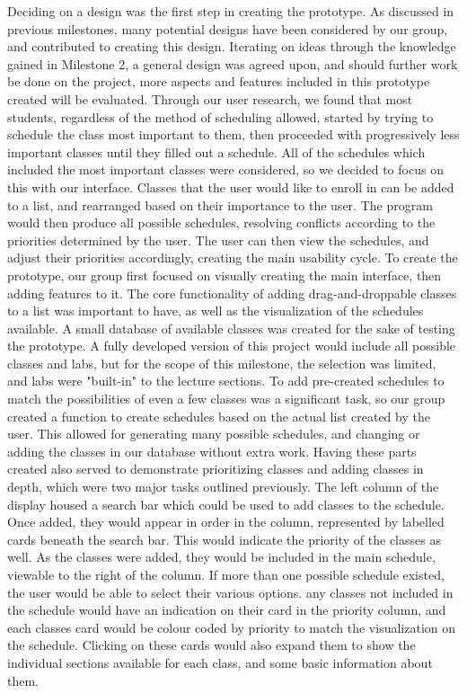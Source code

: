 \documentclass{article}
\begin{document}
Deciding on a design was the first step in creating the prototype. As discussed in previous milestones, many potential designs have been considered by our group, and contributed to creating this design. Iterating on ideas through the knowledge gained in Milestone 2, a general design was agreed upon, and should further work be done on the project, more aspects and features included in this prototype created will be evaluated. Through our user research, we found that most students, regardless of the method of scheduling allowed, started by trying to schedule the class most important to them, then proceeded with progressively less important classes until they filled out a schedule. All of the schedules which included the most important classes were considered, so we decided to focus on this with our interface. Classes that the user would like to enroll in can be added to a list, and rearranged based on their importance to the user. The program would then produce all possible schedules, resolving conflicts according to the priorities determined by the user. The user can then view the schedules, and adjust their priorities accordingly, creating the main usability cycle.
\newline
\newline
To create the prototype, our group first focused on visually creating the main interface, then adding features to it. The core functionality of adding drag-and-droppable classes to a list was important to have, as well as the visualization of the schedules available. A small database of available classes was created for the sake of testing the prototype. A fully developed version of this project would include all possible classes and labs, but for the scope of this milestone, the selection was limited, and labs were "built-in" to the lecture sections. To add pre-created schedules to match the possibilities of even a few classes was a significant task, so our group created a function to create schedules based on the actual list created by the user. This allowed for generating many possible schedules, and changing or adding the classes in our database without extra work. Having these parts created also served to demonstrate prioritizing classes and adding classes in depth, which were two major tasks outlined previously.
\newline
\newline
The left column of the display housed a search bar which could be used to add classes to the schedule. Once added, they would appear in order in the column, represented by labelled cards beneath the search bar. This would indicate the priority of the classes as well. As the classes were added, they would be included in the main schedule, viewable to the right of the column. If more than one possible schedule existed, the user would be able to select their various options. any classes not included in the schedule would have an indication on their card in the priority column, and each classes card would be colour coded by priority to match the visualization on the schedule. Clicking on these cards would also expand them to show the individual sections available for each class, and some basic information about them.
\end{document}
